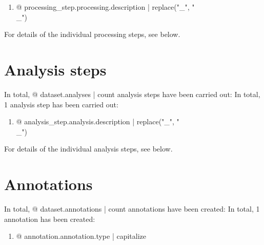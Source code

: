 \begin{enumerate}
\item {@ processing_step.processing.description | replace("_", "\\_") }
\end{enumerate}

For details of the individual processing steps, see below.




\section{Analysis steps}

In total, {@ dataset.analyses | count } analysis steps have been carried out:
In total, 1 analysis step has been carried out:

\begin{enumerate}
\item {@ analysis_step.analysis.description | replace("_", "\\_") }
\end{enumerate}

For details of the individual analysis steps, see below.




\section{Annotations}

In total, {@ dataset.annotations | count } annotations have been created:
In total, 1 annotation has been created:

\begin{enumerate}
\item {@ annotation.annotation.type | capitalize }
\end{enumerate}

